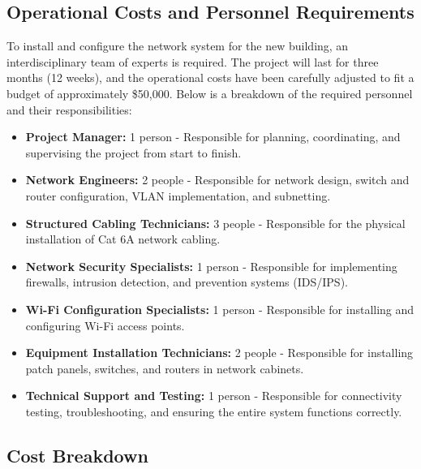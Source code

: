 \documentclass[12pt]{article}
\begin{document}
\subsection{Operational Costs and Personnel Requirements}

To install and configure the network system for the new building, an interdisciplinary team of experts is required. The project will last for three months (12 weeks), and the operational costs have been carefully adjusted to fit a budget of approximately \$50,000. Below is a breakdown of the required personnel and their responsibilities:

\begin{itemize}
    \item \textbf{Project Manager:} 1 person - Responsible for planning, coordinating, and supervising the project from start to finish.
    \item \textbf{Network Engineers:} 2 people - Responsible for network design, switch and router configuration, VLAN implementation, and subnetting.
    \item \textbf{Structured Cabling Technicians:} 3 people - Responsible for the physical installation of Cat 6A network cabling.
    \item \textbf{Network Security Specialists:} 1 person - Responsible for implementing firewalls, intrusion detection, and prevention systems (IDS/IPS).
    \item \textbf{Wi-Fi Configuration Specialists:} 1 person - Responsible for installing and configuring Wi-Fi access points.
    \item \textbf{Equipment Installation Technicians:} 2 people - Responsible for installing patch panels, switches, and routers in network cabinets.
    \item \textbf{Technical Support and Testing:} 1 person - Responsible for connectivity testing, troubleshooting, and ensuring the entire system functions correctly.
\end{itemize}

\subsection{Cost Breakdown}
\end{document}
